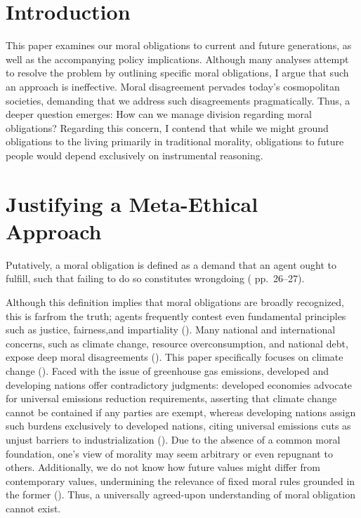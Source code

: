 \documentclass[12pt, a4paper, twoside]{article}
\begin{document}
\maketitle{}

\section{Introduction}

This paper examines our moral obligations to current and future generations, as well as the accompanying policy implications. Although many analyses attempt to resolve the problem by outlining specific moral obligations, I argue that such an approach is ineffective. Moral disagreement pervades today’s cosmopolitan societies, demanding that we address such disagreements pragmatically. Thus, a deeper question emerges: How can we manage division regarding moral obligations? Regarding this concern, I contend that while we might ground obligations to the living primarily in traditional morality, obligations to future people would depend exclusively on instrumental reasoning.

\section{Justifying a Meta-Ethical Approach}

Putatively, a moral obligation is defined as a demand that an agent ought to fulfill, such that failing to do so constitutes wrongdoing (\cite{pick2004} pp.\ 26–27).

Although this definition implies that moral obligations are broadly recognized, this is farfrom the truth; agents frequently contest even fundamental principles such as justice, fairness,and impartiality (\cite{atari2020}). Many national and international concerns, such as climate change, resource overconsumption, and national debt, expose deep moral disagreements (\cite{hasan2023}). This paper specifically
focuses on climate change (\cite{maslin-nodate}). Faced with the issue of greenhouse gas emissions, developed and
developing nations offer contradictory judgments: developed economies advocate for universal emissions reduction requirements, asserting that climate change cannot be contained if any parties are exempt, whereas developing nations assign such burdens exclusively to developed nations, citing universal emissions cuts as unjust barriers to industrialization (\cite{belfiori2024}). Due to the absence of a common moral foundation, one’s view of morality may seem arbitrary or even repugnant to others. Additionally, we do not know how future values might differ from contemporary values,
undermining the relevance of fixed moral rules grounded in the former (\cite{macaskill2019}). Thus, a universally agreed-upon understanding of moral obligation cannot exist.
\end{document}
